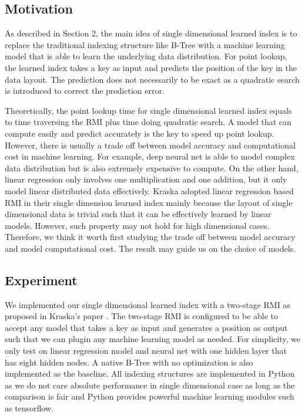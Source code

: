 \documentclass[sigconf,10pt]{acmart}
\begin{document}
\subsection{Motivation}

As described in Section 2, the main idea of single dimensional learned index is to replace
the traditional indexing structure like B-Tree with a machine learning model that is able
to learn the underlying data distribution. For point lookup, the learned index takes a key
as input and predicts the position of the key in the data layout. The prediction does not
necessarily to be exact as a quadratic search is introduced to correct the prediction error.

Theoretically, the point lookup time for single dimensional learned index equals to time
traversing the RMI plus time doing quadratic search. A model that can compute easily and predict
accurately is the key to speed up point lookup. However, there is usually a trade off between
model accuracy and computational cost in machine learning. For example, deep neural net is able
to model complex data distribution but is also extremely expensive to compute. On the other hand,
linear regression only involves one multiplication and one addition, but it only model linear
distributed data effectively. Kraska adopted linear regression based RMI in their single dimension
learned index mainly because the layout of single dimensional data is trivial such that it can be
effectively learned by linear models. However, such property may not hold for high dimensional cases.
Therefore, we think it worth first studying the trade off between model accuracy and model
computational cost. The result may guide us on the choice of models. 

\subsection{Experiment}

We implemented our single dimensional learned index with a two-stage RMI as proposed in 
Kraska's paper \cite{Learned_Index}. The two-stage RMI is configured to be able to accept
any model that takes a key as input and generates a position as output such that we can
plugin any machine learning model as needed. For simplicity, we only test on linear regression
model and neural net with one hidden layer that has eight hidden nodes. A native B-Tree with no optimization is also implemented
as the baseline. All indexing structures are implemented in Python as we do not care absolute
performance in single dimensional case as long as the comparison is fair and Python provides powerful
machine learning modules such as tensorflow. 
\end{document}
